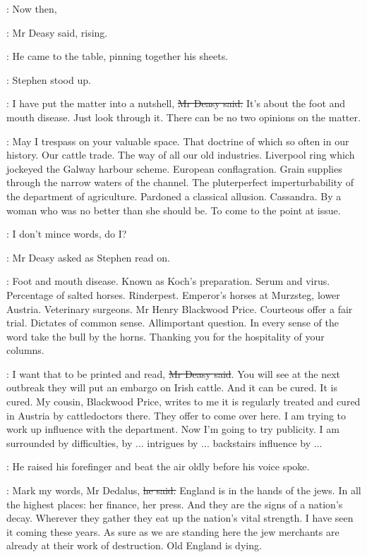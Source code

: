 \deasy:
Now then,

:
Mr Deasy said, rising.

:
He came to the table, pinning together his sheets.

:
Stephen stood up.

\deasy:
I have put the matter into a nutshell, \sout{Mr Deasy said.}
It's about the foot and mouth disease.
Just look through it.
There can be no two opinions on the matter.

\StephenInt: \stage{[Paraphrasing]}
May I trespass on your valuable space.
That doctrine of  which so often in our history.
Our cattle trade.
The way of all our old industries.
Liverpool ring which jockeyed the Galway harbour scheme.
European conflagration.
Grain supplies through the narrow waters of the channel.
The pluterperfect imperturbability of the department of agriculture.
Pardoned a classical allusion.
Cassandra.
By a woman who was no better than she should be.
To come to the point at issue.

\deasy:
I don't mince words, do I?

:
Mr Deasy asked as Stephen read on.

\StephenInt: 
Foot and mouth disease.
Known as Koch's preparation.
Serum and virus.
Percentage of salted horses.
Rinderpest.
Emperor's horses at Murzsteg, lower Austria.
Veterinary surgeons.
Mr Henry Blackwood Price.
Courteous offer a fair trial.
Dictates of common sense.
Allimportant question.
In every sense of the word take the bull by the horns.
Thanking you for the hospitality of your columns.

\deasy:
I want that to be printed and read, \sout{Mr Deasy said}.
You will see at the next outbreak they will put an embargo on Irish cattle.
And it can be cured.
It is cured.
My cousin, Blackwood Price, writes to me
it is regularly treated and cured in Austria by cattledoctors there.
They offer to come over here.
I am trying to work up influence with the department.
Now I'm going to try publicity.
I am surrounded by difficulties,
by ... intrigues by ... backstairs influence by ...

:
He raised his forefinger and beat the air oldly before his voice spoke.

\deasy:
Mark my words, Mr Dedalus, \sout{he said.}
England is in the hands of the jews.
In all the highest places: her finance, her press.
And they are the signs of a nation's decay.
Wherever they gather they eat up the nation's vital strength.
I have seen it coming these years.
As sure as we are standing here
the jew merchants are already at their work of destruction.
Old England is dying.

